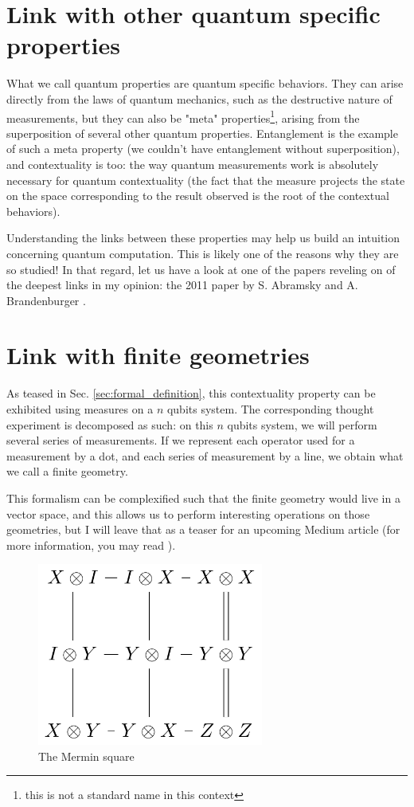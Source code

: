 \documentclass{article}
\begin{document}
\section{Link with other quantum specific properties}
\label{sec:link_with_other_quantum_specific_properties}

What we call quantum properties are quantum specific behaviors. They can arise
directly from the laws of quantum mechanics, such as the destructive nature of
measurements, but they can also be "meta" properties\footnote{this is not a
standard name in this context}, arising from the superposition of several other
quantum properties. Entanglement is the example of such a meta property
(we couldn't have entanglement without superposition), and contextuality is too:
the way quantum measurements work is absolutely necessary for quantum
contextuality (the fact that the measure projects the state on the space
corresponding to the result observed is the root of the contextual behaviors).

Understanding the links between these properties may help us build an intuition
concerning quantum computation. This is likely one of the reasons why they are
so studied! In that regard, let us have a look at one of the papers reveling on
of the deepest links in my opinion: the 2011 paper by S. Abramsky and A.
Brandenburger \cite{AB11}.

\section{Link with finite geometries}
\label{sec:link_with_finite_geometries}

As teased in Sec. \ref{sec:formal_definition}, this contextuality property can
be exhibited using measures on a $n$ qubits system. The corresponding thought
experiment is decomposed as such: on this $n$ qubits system, we will perform
several series of measurements. If we represent each operator used for a
measurement by a dot, and each series of measurement by a line, we obtain what we
call a finite geometry. 

This formalism can be complexified such that the finite geometry would live in a
vector space, and this allows us to perform interesting operations on those
geometries, but I will leave that as a teaser for an upcoming Medium article
(for more information, you may read \cite{dHG+22}).

\begin{figure}[!ht]
\centerline{\includegraphics[height=6cm]{resources/mermin-square.png}}
\caption{The Mermin square}
\label{fig:mermin-square}
\end{figure}
\end{document}
